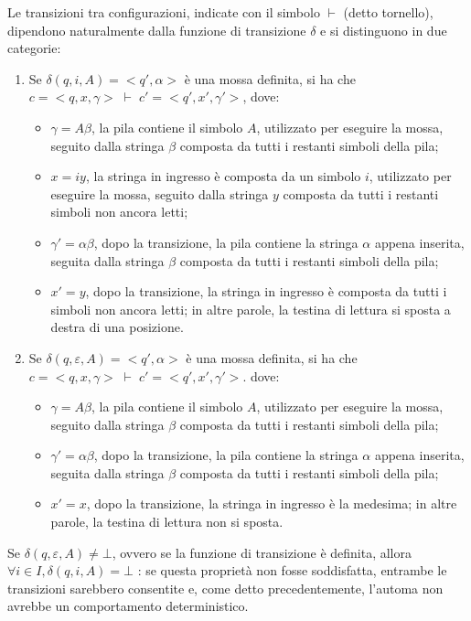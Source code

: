   Le transizioni tra configurazioni, indicate con il simbolo \(\vdash\) (detto tornello), dipendono naturalmente dalla funzione di transizione \(\delta\) e si distinguono in due categorie:
  \begin{enumerate}
    \item Se \(\delta(q,i,A) =<q', \alpha>\) è una mossa definita, si ha che \(c=<q,x,\gamma>\; \vdash \; c'=<q',x',\gamma'>\), dove:
    \begin{itemize}
      \item \(\gamma = A\beta\), la pila contiene il simbolo \(A\), utilizzato per eseguire la mossa, seguito dalla stringa \(\beta\) composta da tutti i restanti simboli della pila;
      \item \(x=iy\), la stringa in ingresso è composta da un simbolo \(i\), utilizzato per eseguire la mossa, seguito dalla stringa \(y\) composta da tutti i restanti simboli non ancora letti;
      \item \(\gamma'=\alpha\beta\), dopo la transizione, la pila contiene la stringa \(\alpha\) appena inserita, seguita dalla stringa \(\beta\) composta da tutti i restanti simboli della pila;
      \item \(x'=y\), dopo la transizione, la stringa in ingresso è composta da tutti i simboli non ancora letti; in altre parole, la testina di lettura si sposta a destra di una posizione. 
    \end{itemize}
    \item Se \(\delta(q,\varepsilon, A) =<q', \alpha>\) è una mossa definita, si ha che \(c=<q,x,\gamma>\;\vdash\; c'=<q',x',\gamma'>\). dove:
    \begin{itemize}
      \item \(\gamma=A\beta\), la pila contiene il simbolo \(A\), utilizzato per eseguire la mossa, seguito dalla stringa \(\beta\) composta da tutti i restanti simboli della pila;
      \item \(\gamma'=\alpha\beta\), dopo la transizione, la pila contiene la stringa \(\alpha\) appena inserita, seguita dalla stringa \(\beta\) composta da tutti i restanti simboli della pila;
      \item \(x'=x\), dopo la transizione, la stringa in ingresso è la medesima; in altre parole, la testina di lettura non si sposta.
    \end{itemize}
  \end{enumerate}

  Se \(\delta(q,\varepsilon, A) \neq \bot\), ovvero se la funzione di transizione è definita, allora \(\forall i \in I, \delta(q,i,A)= \bot\) : se questa proprietà non fosse soddisfatta, entrambe le transizioni sarebbero consentite e, come detto precedentemente, l'automa non avrebbe un comportamento deterministico.

